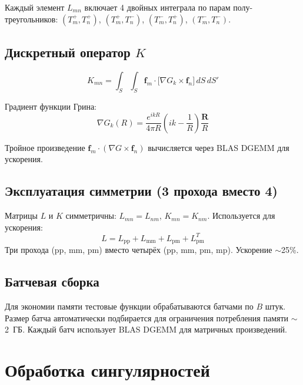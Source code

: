 \documentclass[12pt,a4paper]{article}
\begin{document}
Каждый элемент $L_{mn}$ включает 4 двойных интеграла по парам полу-треугольников:
$(T_m^+, T_n^+)$, $(T_m^+, T_n^-)$, $(T_m^-, T_n^+)$, $(T_m^-, T_n^-)$.

\subsection{Дискретный оператор $K$}

\begin{equation}
  K_{mn} = \int_S \int_S \mathbf{f}_m \cdot \big[\nabla G_k \times \mathbf{f}_n\big] \, dS\,dS'
\end{equation}

Градиент функции Грина:
\begin{equation}
  \nabla G_k(R) = \frac{e^{ikR}}{4\pi R} \left(ik - \frac{1}{R}\right) \frac{\mathbf{R}}{R}
\end{equation}

Тройное произведение $\mathbf{f}_m \cdot (\nabla G \times \mathbf{f}_n)$ вычисляется через BLAS DGEMM для ускорения.

\subsection{Эксплуатация симметрии (3 прохода вместо 4)}

Матрицы $L$ и $K$ симметричны: $L_{mn} = L_{nm}$, $K_{mn} = K_{nm}$. Используется для ускорения:
\begin{equation}
  L = L_{\mathrm{pp}} + L_{\mathrm{mm}} + L_{\mathrm{pm}} + L_{\mathrm{pm}}^T
\end{equation}
Три прохода (pp, mm, pm) вместо четырёх (pp, mm, pm, mp). Ускорение $\sim$25\%.

\subsection{Батчевая сборка}

Для экономии памяти тестовые функции обрабатываются батчами по $B$ штук. Размер батча автоматически подбирается для ограничения потребления памяти $\sim$2~ГБ. Каждый батч использует BLAS DGEMM для матричных произведений.


\section{Обработка сингулярностей}
\end{document}
